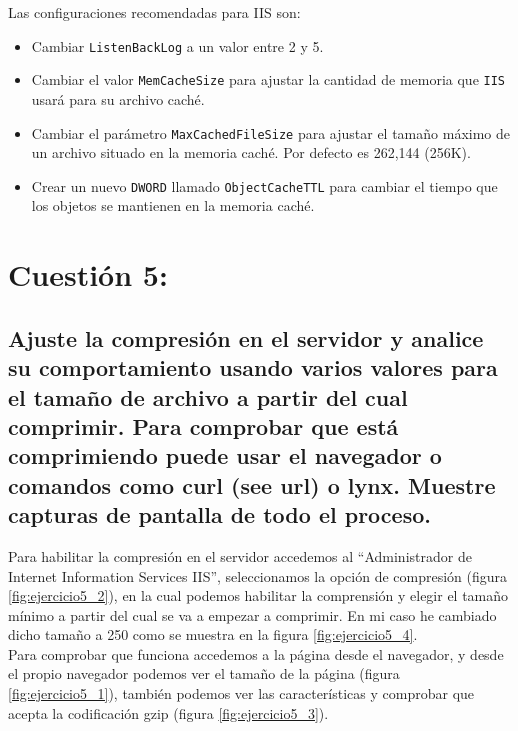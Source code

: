 Las configuraciones recomendadas para IIS son: 
\begin{itemize}
	\item Cambiar \texttt{ListenBackLog} a un valor entre 2 y 5.
	\item Cambiar el valor \texttt{MemCacheSize} para ajustar la cantidad de memoria que \texttt{IIS} usará para su archivo caché.
	\item Cambiar el parámetro \texttt{MaxCachedFileSize} para ajustar el tamaño máximo de un archivo situado en la memoria caché. Por defecto es 262,144 (256K).
	\item Crear un nuevo \texttt{DWORD} llamado \texttt{ObjectCacheTTL} para cambiar el tiempo que los objetos se mantienen en la memoria caché.
\end{itemize}




\section{Cuestión 5:}
\subsection{Ajuste la compresión en el servidor y analice su comportamiento usando varios valores para el tamaño de archivo a partir del cual comprimir. Para comprobar que está comprimiendo puede usar el navegador o comandos como curl (see url) o lynx. Muestre capturas de pantalla de todo el proceso.}

Para habilitar la compresión en el servidor accedemos al ``Administrador de Internet Information Services IIS'', seleccionamos la opción de compresión (figura \ref{fig:ejercicio5_2}), en la cual podemos habilitar la comprensión y elegir el tamaño mínimo a partir del cual se va a empezar a comprimir. En mi caso he cambiado dicho tamaño a 250 como se muestra en la figura \ref{fig:ejercicio5_4}.\\

Para comprobar que funciona accedemos a la página desde el navegador, y desde el propio navegador podemos ver el tamaño de la página (figura \ref{fig:ejercicio5_1}), también podemos ver las características y comprobar que acepta la codificación gzip (figura \ref{fig:ejercicio5_3}). \\

